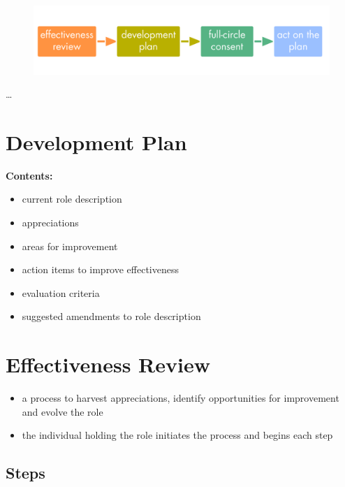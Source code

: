 \begin{figure}[htbp]
\centering
\includegraphics[keepaspectratio,width=\textwidth,height=0.75\textheight]{img/people-and-roles/performance-improvement-process.png}
\end{figure}

{\ldots}

\section{Development Plan}
\label{developmentplan}

\textbf{Contents:}

\begin{itemize}
\item current role description

\item appreciations

\item areas for improvement

\item action items to improve effectiveness

\item evaluation criteria

\item suggested amendments to role description

\end{itemize}

\section{Effectiveness Review}
\label{effectivenessreview}

\begin{itemize}
\item a process to harvest appreciations, identify opportunities for improvement and evolve the role

\item the individual holding the role initiates the process and begins each step

\end{itemize}

\subsection{Steps}
\label{steps}

